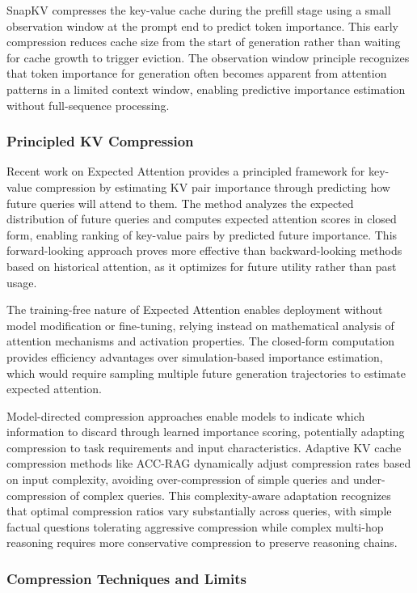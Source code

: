 SnapKV compresses the key-value cache during the prefill stage using a small observation window at the prompt end to predict token importance. This early compression reduces cache size from the start of generation rather than waiting for cache growth to trigger eviction. The observation window principle recognizes that token importance for generation often becomes apparent from attention patterns in a limited context window, enabling predictive importance estimation without full-sequence processing.

\subsubsection{Principled KV Compression}

Recent work on Expected Attention \citep{zhang2025expected} provides a principled framework for key-value compression by estimating KV pair importance through predicting how future queries will attend to them. The method analyzes the expected distribution of future queries and computes expected attention scores in closed form, enabling ranking of key-value pairs by predicted future importance. This forward-looking approach proves more effective than backward-looking methods based on historical attention, as it optimizes for future utility rather than past usage.

The training-free nature of Expected Attention enables deployment without model modification or fine-tuning, relying instead on mathematical analysis of attention mechanisms and activation properties. The closed-form computation provides efficiency advantages over simulation-based importance estimation, which would require sampling multiple future generation trajectories to estimate expected attention.

Model-directed compression approaches enable models to indicate which information to discard through learned importance scoring, potentially adapting compression to task requirements and input characteristics. Adaptive KV cache compression methods like ACC-RAG dynamically adjust compression rates based on input complexity, avoiding over-compression of simple queries and under-compression of complex queries. This complexity-aware adaptation recognizes that optimal compression ratios vary substantially across queries, with simple factual questions tolerating aggressive compression while complex multi-hop reasoning requires more conservative compression to preserve reasoning chains.

\subsubsection{Compression Techniques and Limits}

